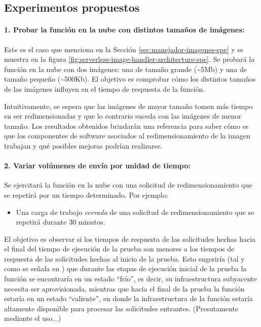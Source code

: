 \subsection{Experimentos propuestos} \label{sec:experimentos-propuestos}

\paragraph{1. Probar la función en la nube con distintos tamaños de imágenes:} Este es el caso que menciona en la Sección \ref{sec:manejador-imagenes-spe} y se muestra en la figura \ref{fig:serverless-image-handler-architecture-spe}. Se probará la función en la nube con dos imágenes: una de tamaño grande (\textasciitilde 5Mb) y una de tamaño pequeño (\textasciitilde 500Kb). El objetivo es comprobar cómo los distintos tamaños de las imágenes influyen en el tiempo de respuesta de la función.

Intuitivamente, se espera que las imágenes de mayor tamaño tomen más tiempo en ser redimensionadas y que lo contrario suceda con las imágenes de menor tamaño. Los resultados obtenidos brindarán una referencia para saber cómo es que los componentes de software asociados al redimensionamiento de la imagen trabajan y qué posibles mejoras podrían realizarse. 

\paragraph{2. Variar volúmenes de envío por unidad de tiempo:} Se ejercitará la función en la nube con una solicitud de redimensionamiento que se repetirá por un tiempo determinado. Por ejemplo:
\begin{itemize}
    \item Una carga de trabajo \emph{cerrada} de una solicitud de redimensionamiento que se repetirá durante 30 minutos. 
\end{itemize}

El objetivo es observar si los tiempos de respuesta de las solicitudes hechas hacia el final del tiempo de ejecución de la prueba son menores a los tiempos de respuesta de las solicitudes hechas al inicio de la prueba. Esto sugeriría (tal y como se señala en \cite{8360324}) que durante las etapas de ejecución inicial de la prueba la función se encontraría en un estado ``frío'', es decir, su infraestructura subyacente necesita ser aprovisionada, mientras que hacia el final de la prueba la función estaría en un estado ``caliente'', en donde la infraestructura de la función estaría altamente disponible para procesar las solicitudes entrantes. (Presutamente mediante el uso...) 

